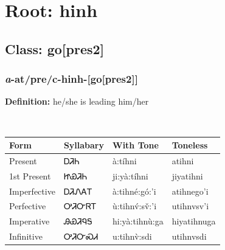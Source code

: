 \needspace{4in}
\section*{Root: hinh}
\nopagebreak
{}
\needspace{3in}
\subsection*{Class: go[pres2]}
\nopagebreak
\needspace{2in}
\subsubsection*{\textit{a}{-}at/pre/c{-}\textbf{hinh}{-}[go[pres2]]}
\nopagebreak
\textbf{Definition: } he/she is leading him/her
\\[0.5em]
\begin{tabularx}{\textwidth}{l X X X}%
\toprule%
\textbf{Form}&\textbf{Syllabary}&\textbf{With Tone}&\textbf{Toneless}\\%
\midrule%
Present&ᎠᏘᏂ&à:tíhni&atihni\\%
1st Present&ᏥᏯᏘᏂ&ji:yà:tíhni&jiyatihni\\%
Imperfective&ᎠᏘᏁᎪᎢ&à:tihné:gó:’i&atihnego’i\\%
Perfective&ᎤᏘᏅᏒᎢ&ù:tihnv́:sv̌:’i&utihnvsv’i\\%
Imperative&ᎯᏯᏘᏄᎦ&hi:yà:tihnù:ga&hiyatihnuga\\%
Infinitive&ᎤᏘᏅᏍᏗ&u:tihnv̀:sdi&utihnvsdi\\%
\bottomrule%
\end{tabularx}
\\[1em]